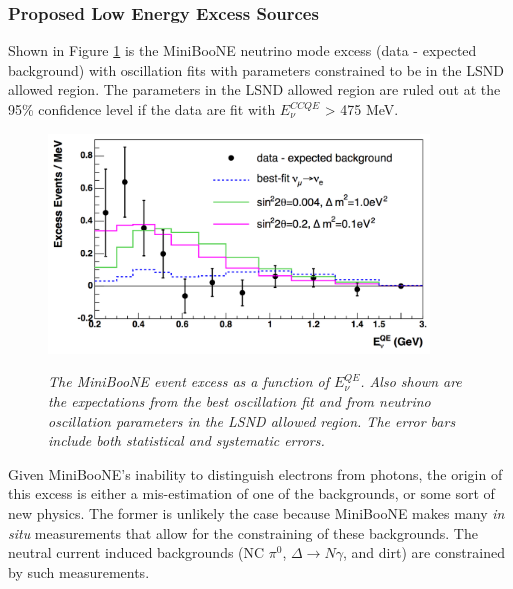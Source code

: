 \subsubsection{Proposed Low Energy Excess Sources}
Shown in Figure \ref{MB_published_excess_fits_fig} is the MiniBooNE neutrino mode excess (data - expected background) with oscillation fits with parameters constrained to be in the LSND allowed region. The parameters in the LSND allowed region are ruled out at the 95\% confidence level if the data are fit with $E_\nu^{CCQE}$ > 475 MeV. \\

\begin{figure}[ht!]
\centering
	\includegraphics[width=0.9\textwidth]{Figures/MB_published_excess_fits.png} \\
\caption{\textit{The MiniBooNE event excess as a function of $E_\nu^{QE}$. Also shown are the expectations from the best oscillation fit and from neutrino oscillation parameters in the LSND allowed region. The error bars include both statistical and systematic errors.}}\label{MB_published_excess_fits_fig}
\end{figure}

Given MiniBooNE's inability to distinguish electrons from photons, the origin of this excess is either a mis-estimation of one of the backgrounds, or some sort of new physics. The former is unlikely the case because MiniBooNE makes many \textit{in situ} measurements that allow for the constraining of these backgrounds. The neutral current induced backgrounds (NC $\pi^0$, $\Delta\rightarrow N\gamma$, and dirt) are constrained by such measurements.\\


